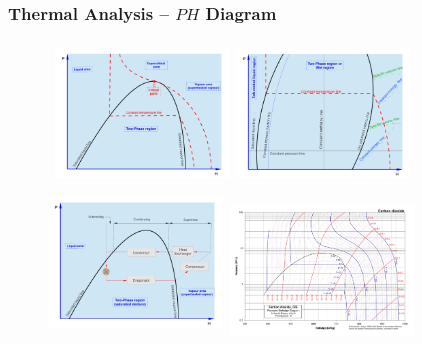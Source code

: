 \documentclass[10pt,compress,handout,ignorenonframetext]{beamer}
\begin{document}
\begin{frame}
 \frametitle{Thermal Analysis -- $PH$ Diagram}
   \begin{figure}%
     \vbox{
      \hbox{\hspace{.8cm}
      \includegraphics[width=4.6cm,height=3.8cm,clip]{./Pics/Overview_Refrig18}
      \hspace{.1cm}
      \includegraphics[width=4.6cm,height=3.8cm,clip]{./Pics/Overview_Refrig17}}
      \vspace{-.1cm}
      \hbox{\hspace{.8cm}
      \includegraphics[width=4.6cm,height=3.87cm,clip]{./Pics/Overview_Refrig19}
      \hspace{.1cm}
      \includegraphics[width=4.9cm,height=4.cm,clip]{./Pics/CO2col}}}
   \end{figure}
\end{frame}
\end{document}
